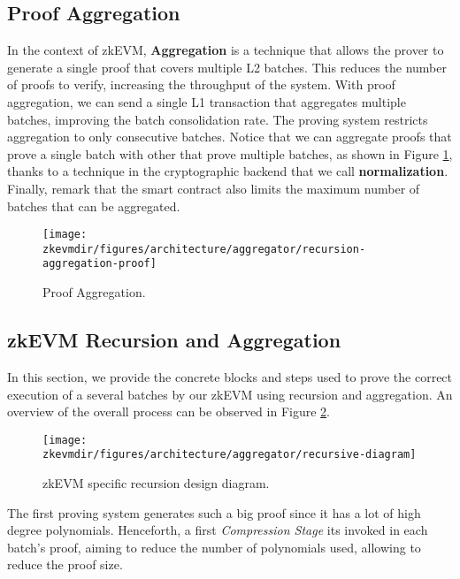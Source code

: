 \subsection{Proof Aggregation}

In the context of zkEVM, \textbf{Aggregation} is a technique that allows the prover to generate a single proof that covers multiple L2 batches. This reduces the number of proofs to verify, increasing the throughput of the system. With proof aggregation, we can send a single L1 transaction that aggregates multiple batches, improving the batch consolidation rate. The proving system restricts aggregation to only consecutive batches. Notice that we can aggregate proofs that prove a single batch with other that prove multiple batches, as shown in Figure \ref{fig:proof-aggregation}, thanks to a technique in the cryptographic backend that we call \textbf{normalization}. Finally, remark that the smart contract also limits the maximum number of batches that can be aggregated.

\begin{figure}[H]
\centering
\texttt{[image: \\zkevmdir/figures/architecture/aggregator/recursion-aggregation-proof]}
\caption{Proof Aggregation.}
\label{fig:proof-aggregation}
\end{figure}




\subsection{zkEVM Recursion and Aggregation}

In this section, we provide the concrete blocks and steps used to
prove the correct execution of a several batches by our zkEVM using recursion and aggregation. An overview of the overall process can be observed in Figure \ref{fig:zkevm-recursion}.


\begin{figure}[H]
\centering
\texttt{[image: \\zkevmdir/figures/architecture/aggregator/recursive-diagram]}
\caption{zkEVM specific recursion design diagram.}
\label{fig:zkevm-recursion}
\end{figure}


The first proving system generates such a big proof since it has a lot of high degree polynomials. Henceforth, a first \textit{Compression Stage} its invoked in each batch's proof, aiming to reduce the number of polynomials used, allowing to reduce the proof size.

